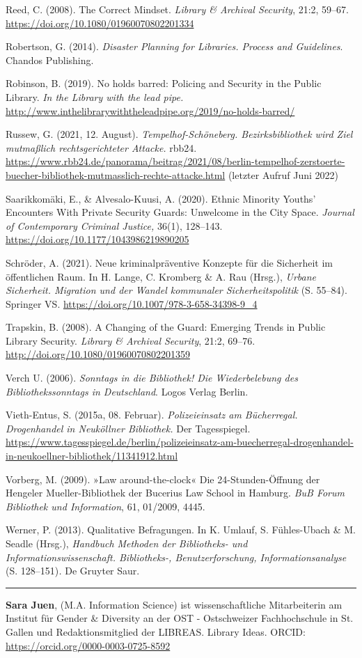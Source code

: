 \documentclass[a4paper,
fontsize=11pt,
oneside,
numbers=noperiodatend,
parskip=half-,
bibliography=totoc,
final
]{scrartcl}
\begin{document}
Reed, C. (2008). The Correct Mindset. \emph{Library \& Archival
Security}, 21:2, 59--67. \url{https://doi.org/10.1080/01960070802201334}

Robertson, G. (2014). \emph{Disaster Planning for Libraries. Process and
Guidelines}. Chandos Publishing.

Robinson, B. (2019). No holds barred: Policing and Security in the
Public Library. \emph{In the Library with the lead pipe.}
\url{http://www.inthelibrarywiththeleadpipe.org/2019/no-holds-barred/}

Russew, G. (2021, 12. August). \emph{Tempelhof-Schöneberg.
Bezirksbibliothek wird Ziel mutmaßlich rechtsgerichteter Attacke.}
rbb24.
\url{https://www.rbb24.de/panorama/beitrag/2021/08/berlin-tempelhof-zerstoerte-buecher-bibliothek-mutmasslich-rechte-attacke.html}
(letzter Aufruf Juni 2022)

Saarikkomäki, E., \& Alvesalo-Kuusi, A. (2020). Ethnic Minority Youths'
Encounters With Private Security Guards: Unwelcome in the City Space.
\emph{Journal of Contemporary Criminal Justice,} 36(1), 128--143.
\url{https://doi.org/10.1177/1043986219890205}

Schröder, A. (2021). Neue kriminalpräventive Konzepte für die Sicherheit
im öffentlichen Raum. In H. Lange, C. Kromberg \& A. Rau (Hrsg.),
\emph{Urbane Sicherheit. Migration und der Wandel kommunaler
Sicherheitspolitik} (S. 55--84). Springer VS.
\url{https://doi.org/10.1007/978-3-658-34398-9_4}

Trapskin, B. (2008). A Changing of the Guard: Emerging Trends in Public
Library Security. \emph{Library \& Archival Security}, 21:2, 69--76.
\url{http://doi.org/10.1080/01960070802201359}

Verch U. (2006). \emph{Sonntags in die Bibliothek! Die Wiederbelebung
des Bibliothekssonntags in Deutschland}. Logos Verlag Berlin.

Vieth-Entus, S. (2015a, 08. Februar). \emph{Polizeieinsatz am
Bücherregal. Drogenhandel in Neuköllner Bibliothek.} Der Tagesspiegel.
\url{https://www.tagesspiegel.de/berlin/polizeieinsatz-am-buecherregal-drogenhandel-in-neukoellner-bibliothek/11341912.html}

Vorberg, M. (2009). »Law around-the-clock« Die 24-Stunden-Öffnung der
Hengeler Mueller-Bibliothek der Bucerius Law School in Hamburg.
\emph{BuB Forum Bibliothek und Information}, 61, 01/2009, 4445.

Werner, P. (2013). Qualitative Befragungen. In K. Umlauf, S.
Fühles-Ubach \& M. Seadle (Hrsg.), \emph{Handbuch Methoden der
Bibliotheks- und Informationswissenschaft. Bibliotheks-,
Benutzerforschung, Informationsanalyse} (S. 128--151)\emph{.} De Gruyter
Saur.

\begin{center}\rule{0.5\linewidth}{0.5pt}\end{center}

\textbf{Sara Juen}, (M.A. Information Science) ist wissenschaftliche
Mitarbeiterin am Institut für Gender \& Diversity an der OST -
Ostschweizer Fachhochschule in St. Gallen und Redaktionsmitglied der
LIBREAS. Library Ideas. ORCID: \url{https://orcid.org/0000-0003-0725-8592}
\end{document}
